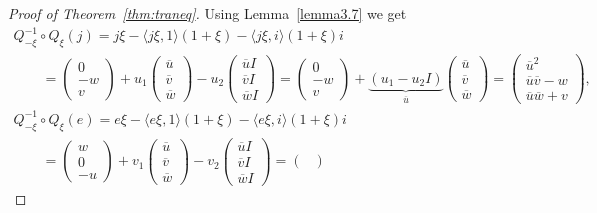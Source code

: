 \documentclass[10pt,a4paper]{amsart}
\numberwithin{equation}{section}
\begin{document}
\begin{proof}[Proof of Theorem~\ref{thm:traneq}]
Using Lemma~\ref{lemma3.7} we get
 \begin{gather*}
 Q_{-\xi}^{-1}\circ Q_\xi(j)=j \xi- \langle j \xi,1\rangle(1+\xi)- \langle j\xi ,i\rangle (1+\xi)i \\
 \qquad{}=\begin{pmatrix}
 0 \\ -w \\ v
 \end{pmatrix} + u_1
 \begin{pmatrix}
 \overline{u} \\ \overline{v} \\ \overline{w}
 \end{pmatrix}
 -u_2
 \begin{pmatrix}
 \overline{u} I \\ \overline{v} I \\ \overline{w}I
 \end{pmatrix}=
 \begin{pmatrix}
 0 \\ -w \\ v
 \end{pmatrix} + \underbrace{(u_1-u_2I)}_{\overline{u}}
 \begin{pmatrix}
 \overline{u} \\ \overline{v} \\ \overline{w}
 \end{pmatrix}=
 \begin{pmatrix}
 \overline{u}^2 \\ \overline{u}\overline{v}-w \\ \overline{u}\overline{w}+v
 \end{pmatrix},\\
 Q_{-\xi}^{-1}\circ Q_\xi(e)=e \xi- \langle e \xi,1\rangle(1+\xi)- \langle e\xi ,i\rangle (1+\xi)i \\
 \qquad{}=\begin{pmatrix}
 w \\ 0 \\ -u
 \end{pmatrix} + v_1
 \begin{pmatrix}
 \overline{u} \\ \overline{v} \\ \overline{w}
 \end{pmatrix}
 - v_2
 \begin{pmatrix}
 \overline{u} I \\ \overline{v} I \\ \overline{w}I
 \end{pmatrix}=
 \begin{pmatrix}

\end{pmatrix}
\end{gather*}
\end{proof}
\end{document}
